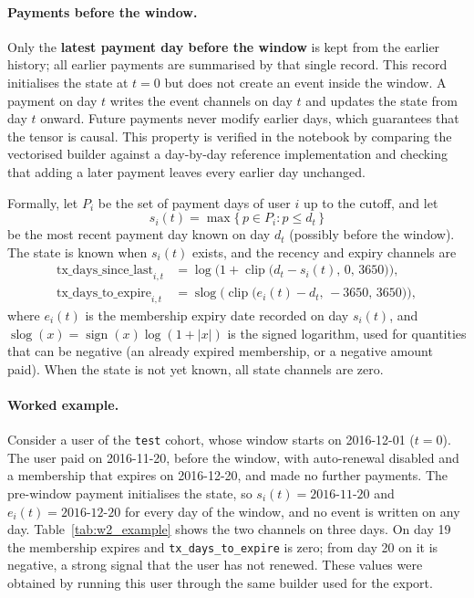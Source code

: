 \documentclass{article}
\newcommand{\slog}{\operatorname{slog}}
\newcommand{\clip}{\operatorname{clip}}
\begin{document}
\paragraph{Payments before the window.} Only the \textbf{latest payment day before the window} is kept from the earlier history; all earlier payments are summarised by that single record. This record initialises the state at $t = 0$ but does not create an event inside the window. A payment on day $t$ writes the event channels on day $t$ and updates the state from day $t$ onward. Future payments never modify earlier days, which guarantees that the tensor is causal. This property is verified in the notebook by comparing the vectorised builder against a day-by-day reference implementation and checking that adding a later payment leaves every earlier day unchanged.

Formally, let $P_i$ be the set of payment days of user $i$ up to the cutoff, and let
\begin{equation}
s_i(t) = \max \{\, p \in P_i : p \le d_t \,\}
\end{equation}
be the most recent payment day known on day $d_t$ (possibly before the window). The state is known when $s_i(t)$ exists, and the recency and expiry channels are
\begin{align}
\text{tx\_days\_since\_last}_{i,t} &= \log\!\Big(1 + \clip\big(d_t - s_i(t),\, 0,\, 3650\big)\Big), \\
\text{tx\_days\_to\_expire}_{i,t}  &= \slog\!\Big(\clip\big(e_i(t) - d_t,\, -3650,\, 3650\big)\Big),
\end{align}
where $e_i(t)$ is the membership expiry date recorded on day $s_i(t)$, and $\slog(x) = \operatorname{sign}(x)\log(1 + |x|)$ is the signed logarithm, used for quantities that can be negative (an already expired membership, or a negative amount paid). When the state is not yet known, all state channels are zero.

\paragraph{Worked example.} Consider a user of the \texttt{test} cohort, whose window starts on 2016-12-01 ($t = 0$). The user paid on 2016-11-20, before the window, with auto-renewal disabled and a membership that expires on 2016-12-20, and made no further payments. The pre-window payment initialises the state, so $s_i(t) = \text{2016-11-20}$ and $e_i(t) = \text{2016-12-20}$ for every day of the window, and no event is written on any day. Table~\ref{tab:w2_example} shows the two channels on three days. On day 19 the membership expires and \texttt{tx\_days\_to\_expire} is zero; from day 20 on it is negative, a strong signal that the user has not renewed. These values were obtained by running this user through the same builder used for the export.
\end{document}
